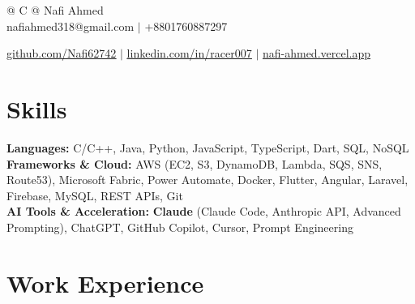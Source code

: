 \documentclass[a4paper,8pt]{article}
\begin{document}
\pagestyle{empty}

\begin{tabularx}{\linewidth}{@{} C @{}}
\color[HTML]{1C033C} \Huge{Nafi Ahmed} \\[4pt]
\textcolor[HTML]{371e77}{{{{\faEnvelope} nafiahmed318@gmail.com}} $|$}
\textcolor[HTML]{371e77}{{{\faMobile} +8801760887297}}

\textcolor[HTML]{371e77}{\underline{{\raisebox{-0.05\height}{\faGithub} \href{https://github.com/Nafi62742}{github.com/Nafi62742}}} $|$}
\textcolor[HTML]{371e77}{\underline{{\raisebox{-0.05\height}{\faLinkedin} \href{https://linkedin.com/in/racer007}{linkedin.com/in/racer007}}} $|$}
\textcolor[HTML]{371e77}{\underline{{\raisebox{-0.05\height}{\faGlobe} \href{https://nafi-ahmed.vercel.app}{nafi-ahmed.vercel.app}}}}
\end{tabularx}

\vspace{1pt}
\section{Skills}
\color[HTML]{1C033C}\textbf{Languages:} C/C++, Java, Python, JavaScript, TypeScript, Dart, SQL, NoSQL\\[1.5pt]
\color[HTML]{1C033C}\textbf{Frameworks \& Cloud:} AWS (EC2, S3, DynamoDB, Lambda, SQS, SNS, Route53), Microsoft Fabric, Power Automate, Docker, Flutter, Angular, Laravel, Firebase, MySQL, REST APIs, Git\\[1.5pt]
\color[HTML]{1C033C}\textbf{AI Tools \& Acceleration:} \textbf{Claude} (Claude Code, Anthropic API, Advanced Prompting), ChatGPT, GitHub Copilot, Cursor, Prompt Engineering\\[1.5pt]

\vspace{2pt}
\section{Work Experience}
\end{document}

